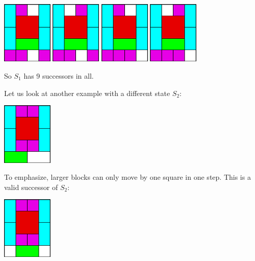 \documentclass[10pt,a4paper]{article}
\begin{document}
\centerline{
    \includegraphics[width=0.18\textwidth]{figure_7.eps}
    \includegraphics[width=0.18\textwidth]{figure_8.eps}
    \includegraphics[width=0.18\textwidth]{figure_9.eps}
    \includegraphics[width=0.18\textwidth]{figure_10.eps}
}

So $S_1$ has 9 successors in all. 

Let us look at another example with a different state $S_2$:

\centerline{\includegraphics[width=0.18\textwidth]{figure_11.eps}}

To emphasize, larger blocks can only move by one square in one step.
This is a valid successor of $S_2$: 

\centerline{\includegraphics[width=0.18\textwidth]{figure_12.eps}}
\end{document}
